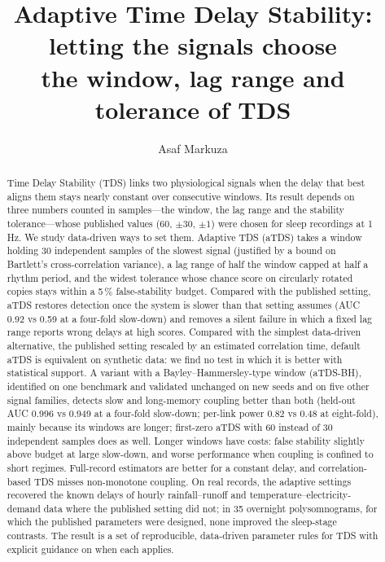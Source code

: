 \documentclass[11pt,a4paper]{article}
\title{Adaptive Time Delay Stability: letting the signals choose\\the window, lag range and tolerance of TDS}
\author{Asaf Markuza}
\date{}
\begin{document}
\maketitle

\begin{abstract}
Time Delay Stability (TDS) links two physiological signals when the delay that best aligns them stays nearly constant over consecutive windows. Its result depends on three numbers counted in samples---the window, the lag range and the stability tolerance---whose published values (60, $\pm30$, $\pm1$) were chosen for sleep recordings at 1\,Hz. We study data-driven ways to set them. Adaptive TDS (aTDS) takes a window holding 30 independent samples of the slowest signal (justified by a bound on Bartlett's cross-correlation variance), a lag range of half the window capped at half a rhythm period, and the widest tolerance whose chance score on circularly rotated copies stays within a 5\,\% false-stability budget. Compared with the published setting, aTDS restores detection once the system is slower than that setting assumes (AUC 0.92 vs 0.59 at a four-fold slow-down) and removes a silent failure in which a fixed lag range reports wrong delays at high scores. Compared with the simplest data-driven alternative, the published setting rescaled by an estimated correlation time, default aTDS is equivalent on synthetic data: we find no test in which it is better with statistical support. A variant with a Bayley--Hammersley-type window (aTDS-BH), identified on one benchmark and validated unchanged on new seeds and on five other signal families, detects slow and long-memory coupling better than both (held-out AUC 0.996 vs 0.949 at a four-fold slow-down; per-link power 0.82 vs 0.48 at eight-fold), mainly because its windows are longer; first-zero aTDS with 60 instead of 30 independent samples does as well. Longer windows have costs: false stability slightly above budget at large slow-down, and worse performance when coupling is confined to short regimes. Full-record estimators are better for a constant delay, and correlation-based TDS misses non-monotone coupling. On real records, the adaptive settings recovered the known delays of hourly rainfall--runoff and temperature--electricity-demand data where the published setting did not; in 35 overnight polysomnograms, for which the published parameters were designed, none improved the sleep-stage contrasts. The result is a set of reproducible, data-driven parameter rules for TDS with explicit guidance on when each applies.
\end{abstract}
\end{document}
